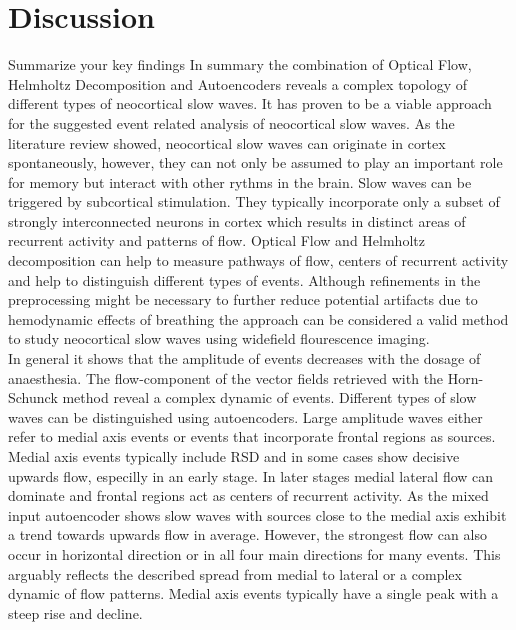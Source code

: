 
\chapter{Discussion} %

Summarize your key findings
In summary the combination of Optical Flow, Helmholtz Decomposition and Autoencoders reveals a complex topology of different types of neocortical slow waves. It has proven to be a viable approach for the suggested event related analysis of neocortical slow waves. As the literature review showed, neocortical slow waves can originate in cortex spontaneously, however, they can not only be assumed to play an important role for memory but interact with other rythms in the brain. Slow waves can be triggered by subcortical stimulation. They typically incorporate only a subset of strongly interconnected neurons in cortex which results in distinct areas of recurrent activity and patterns of flow. Optical Flow and Helmholtz decomposition can help to measure pathways of flow, centers of recurrent activity and help to distinguish different types of events. Although refinements in the preprocessing might be necessary to further reduce potential artifacts due to hemodynamic effects of breathing the approach can be considered a valid method to study neocortical slow waves using widefield flourescence imaging.\\
In general it shows that the amplitude of events decreases with the dosage of anaesthesia. The flow-component of the vector fields retrieved with the Horn-Schunck method reveal a complex dynamic of events. Different types of slow waves can be distinguished using autoencoders. Large amplitude waves either refer to medial axis events or events that incorporate frontal regions as sources.\\
 Medial axis events typically include RSD and in some cases show decisive upwards flow, especilly in an early stage. In later stages medial lateral flow can dominate and frontal regions act as centers of recurrent activity. As the mixed input autoencoder shows slow waves with sources close to the medial axis exhibit a trend towards upwards flow in average. However, the strongest flow can also occur in horizontal direction or in all four main directions for many events. This arguably reflects the described spread from medial to lateral or a complex dynamic of flow patterns. Medial axis events typically have a single peak with a steep rise and decline.\\
